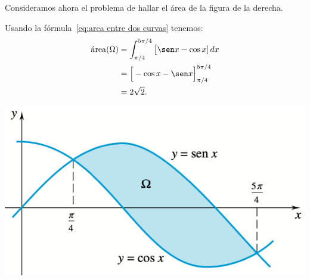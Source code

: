   \begin{example}
    Consideramos ahora el problema de hallar el área de la figura de la derecha.

    \noindent
    \begin{minipage}{.55\textwidth}
      Usando la fórmula~\eqref{eq:area entre dos curvas} tenemos:
      \begin{align*}
        \area(\Omega) 
        &= \int_{\pi/4}^{5\pi/4} \big[\sen x-\cos x]\dx 
        \\
        &= \Big[-\cos x-\sen x\Big]_{\pi/4}^{5\pi/4}
        \\ 
        &= 2\sqrt{2}.
      \end{align*}
    \end{minipage}
    \begin{minipage}{.44\textwidth}
      \includegraphics[width=.95\textwidth]{pics/areas-5.png}
    \end{minipage}    
  \end{example}

